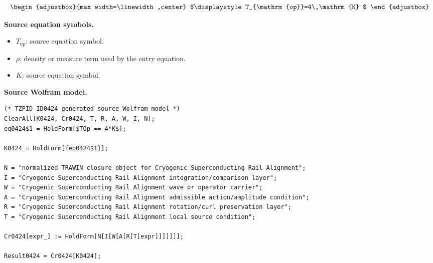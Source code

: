 \[
\begin{adjustbox}{max width=\linewidth,center}
$\displaystyle
T_{\mathrm{op}}=4\,\mathrm{K}
$
\end{adjustbox}
\]

\begin{minipage}[t]{0.49\linewidth}
\begingroup
\small
\raggedright
\textbf{Source equation symbols.}\par
\begin{itemize}[leftmargin=1.35em,itemsep=1pt,topsep=1pt,parsep=0pt]
    \item $T_{\mathrm{op}}$: source equation symbol.
    \item $\rho$: density or measure term used by the entry equation.
    \item $K$: source equation symbol.
\end{itemize}
\endgroup
\end{minipage}\hfill
\begin{minipage}[t]{0.47\linewidth}
\begingroup
\scriptsize
\raggedright
\textbf{Source Wolfram model.}\par
\begin{Verbatim}[fontsize=\tiny,breaklines=true,breakanywhere=true]
(* TZPID ID0424 generated source Wolfram model *)
ClearAll[K0424, Cr0424, T, R, A, W, I, N];
eq0424$1 = HoldForm[$TOp == 4*K$];

K0424 = HoldForm[{eq0424$1}];

N = "normalized TRAWIN closure object for Cryogenic Superconducting Rail Alignment";
I = "Cryogenic Superconducting Rail Alignment integration/comparison layer";
W = "Cryogenic Superconducting Rail Alignment wave or operator carrier";
A = "Cryogenic Superconducting Rail Alignment admissible action/amplitude condition";
R = "Cryogenic Superconducting Rail Alignment rotation/curl preservation layer";
T = "Cryogenic Superconducting Rail Alignment local source condition";

Cr0424[expr_] := HoldForm[N[I[W[A[R[T[expr]]]]]]];

Result0424 = Cr0424[K0424];
\end{Verbatim}
\endgroup
\end{minipage}

